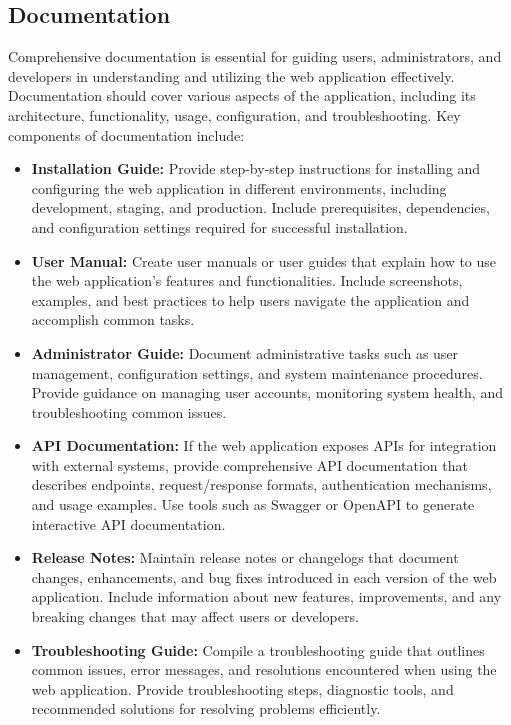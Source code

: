 \documentclass[12pt,a4paper]{report}
\begin{document}
\subsection{Documentation}

Comprehensive documentation is essential for guiding users, administrators, and developers in understanding and utilizing the web application effectively. Documentation should cover various aspects of the application, including its architecture, functionality, usage, configuration, and troubleshooting. Key components of documentation include:

\begin{itemize}
    \item \textbf{Installation Guide:} Provide step-by-step instructions for installing and configuring the web application in different environments, including development, staging, and production. Include prerequisites, dependencies, and configuration settings required for successful installation.
    
    \item \textbf{User Manual:} Create user manuals or user guides that explain how to use the web application's features and functionalities. Include screenshots, examples, and best practices to help users navigate the application and accomplish common tasks.
    
    \item \textbf{Administrator Guide:} Document administrative tasks such as user management, configuration settings, and system maintenance procedures. Provide guidance on managing user accounts, monitoring system health, and troubleshooting common issues.
    
    \item \textbf{API Documentation:} If the web application exposes APIs for integration with external systems, provide comprehensive API documentation that describes endpoints, request/response formats, authentication mechanisms, and usage examples. Use tools such as Swagger or OpenAPI to generate interactive API documentation.
    
    \item \textbf{Release Notes:} Maintain release notes or changelogs that document changes, enhancements, and bug fixes introduced in each version of the web application. Include information about new features, improvements, and any breaking changes that may affect users or developers.
    
    \item \textbf{Troubleshooting Guide:} Compile a troubleshooting guide that outlines common issues, error messages, and resolutions encountered when using the web application. Provide troubleshooting steps, diagnostic tools, and recommended solutions for resolving problems efficiently.


\end{itemize}
\end{document}
